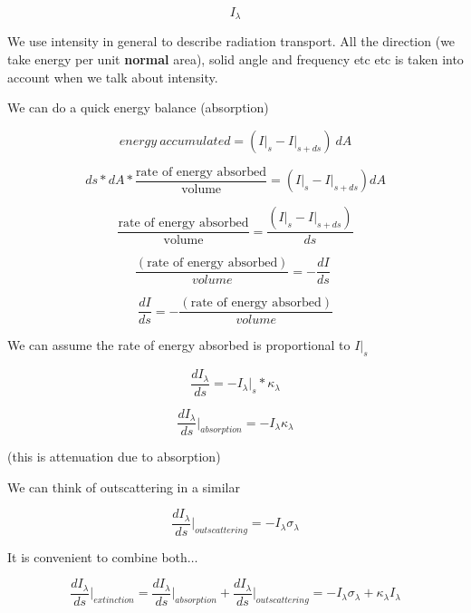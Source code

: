 \documentclass[12pt]{article}
\renewcommand{\_}{\kern-1.5pt\textunderscore\kern-1.5pt}
\begin{document}
 \[ I_{ \lambda } \] \par

\par

We use intensity in general to describe radiation transport. All the direction (we take energy per unit \textbf{normal} area), solid angle and frequency etc etc is taken into account when we talk about intensity.\par

We can do a quick energy balance (absorption)\par

\[energy~accumulated=\left(I\vert_{s}-I\vert_{s+ds} \right)~dA\] \par

\[
ds\ast dA\ast\frac{\text{rate of energy absorbed}}{\text{volume}}=(I\vert_{s}-I\vert_{s+ds})dA
\] \par

 \[ \frac{\text{rate of energy absorbed}}{\text{volume}}=\frac{(I\vert_{s}-I\vert_{s+ds})}{ds} \] \par

 \[ \frac{ \left( \text{rate of energy absorbed} \right) }{volume}=-\frac{dI}{ds}~~ \] \par

 \[ \frac{dI}{ds}=-\frac{ \left( \text{rate of energy absorbed} \right) }{volume} \] \par

We can assume the rate of energy absorbed is proportional to  \( I\vert_{s} \) \par

 \[ \frac{dI_{ \lambda }}{ds}=-I_{ \lambda }\vert _{s}\ast \kappa _{ \lambda } \] \par

 \[ \frac{dI_{ \lambda }}{ds}\vert _{absorption}=-I_{ \lambda } \kappa _{ \lambda } \] \par

(this is attenuation due to absorption)\par

We can think of outscattering in a similar\par

 \[ \frac{dI_{ \lambda }}{ds}\vert _{outscattering}=-I_{ \lambda } \sigma _{ \lambda } \] \par

It is convenient to combine both$ \ldots $ \par

 \[ \frac{dI_{ \lambda }}{ds}\vert _{extinction}=\frac{dI_{ \lambda }}{ds}\vert _{absorption}+\frac{dI_{ \lambda }}{ds}\vert _{outscattering}=-I_{\lambda} \sigma _{ \lambda }+ \kappa _{ \lambda }I_{ \lambda } \] \par
\end{document}
